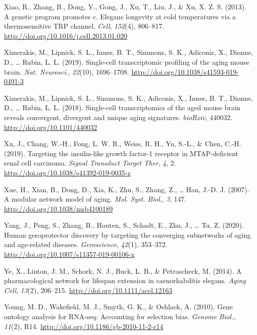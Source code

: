 \documentclass[12pt,twoside]{unicam}
\begin{document}
\begin{cslreferences}
\leavevmode\hypertarget{ref-Xiao2013}{}%
Xiao, R., Zhang, B., Dong, Y., Gong, J., Xu, T., Liu, J., \& Xu, X. Z. S. (2013). A genetic program promotes c. Elegans longevity at cold temperatures via a thermosensitive TRP channel. \emph{Cell}, \emph{152}(4), 806--817. \url{http://doi.org/10.1016/j.cell.2013.01.020}

\leavevmode\hypertarget{ref-Ximerakis2019}{}%
Ximerakis, M., Lipnick, S. L., Innes, B. T., Simmons, S. K., Adiconis, X., Dionne, D., \ldots{} Rubin, L. L. (2019). Single-cell transcriptomic profiling of the aging mouse brain. \emph{Nat. Neurosci.}, \emph{22}(10), 1696--1708. \url{http://doi.org/10.1038/s41593-019-0491-3}

\leavevmode\hypertarget{ref-Ximerakis2018}{}%
Ximerakis, M., Lipnick, S. L., Simmons, S. K., Adiconis, X., Innes, B. T., Dionne, D., \ldots{} Rubin, L. L. (2018). Single-cell transcriptomics of the aged mouse brain reveals convergent, divergent and unique aging signatures. \emph{bioRxiv}, 440032. \url{http://doi.org/10.1101/440032}

\leavevmode\hypertarget{ref-Xu2019}{}%
Xu, J., Chang, W.-H., Fong, L. W. R., Weiss, R. H., Yu, S.-L., \& Chen, C.-H. (2019). Targeting the insulin-like growth factor-1 receptor in MTAP-deficient renal cell carcinoma. \emph{Signal Transduct Target Ther}, \emph{4}, 2. \url{http://doi.org/10.1038/s41392-019-0035-z}

\leavevmode\hypertarget{ref-Xue2007}{}%
Xue, H., Xian, B., Dong, D., Xia, K., Zhu, S., Zhang, Z., \ldots{} Han, J.-D. J. (2007). A modular network model of aging. \emph{Mol. Syst. Biol.}, \emph{3}, 147. \url{http://doi.org/10.1038/msb4100189}

\leavevmode\hypertarget{ref-Yang2018}{}%
Yang, J., Peng, S., Zhang, B., Houten, S., Schadt, E., Zhu, J., \ldots{} Tu, Z. (2020). Human geroprotector discovery by targeting the converging subnetworks of aging and age-related diseases. \emph{Geroscience}, \emph{42}(1), 353--372. \url{http://doi.org/10.1007/s11357-019-00106-x}

\leavevmode\hypertarget{ref-Ye2014}{}%
Ye, X., Linton, J. M., Schork, N. J., Buck, L. B., \& Petrascheck, M. (2014). A pharmacological network for lifespan extension in caenorhabditis elegans. \emph{Aging Cell}, \emph{13}(2), 206--215. \url{http://doi.org/10.1111/acel.12163}

\leavevmode\hypertarget{ref-Young2010}{}%
Young, M. D., Wakefield, M. J., Smyth, G. K., \& Oshlack, A. (2010). Gene ontology analysis for RNA-seq: Accounting for selection bias. \emph{Genome Biol.}, \emph{11}(2), R14. \url{http://doi.org/10.1186/gb-2010-11-2-r14}


\end{cslreferences}
\end{document}
